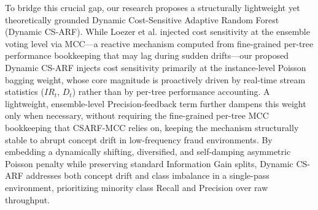 \documentclass[review,12pt]{elsarticle}
\begin{document}
To bridge this crucial gap, our research proposes a structurally lightweight yet theoretically grounded Dynamic Cost-Sensitive Adaptive Random Forest (Dynamic CS-ARF). While Loezer et al. injected cost sensitivity at the ensemble voting level via MCC---a reactive mechanism computed from fine-grained per-tree performance bookkeeping that may lag during sudden drifts---our proposed Dynamic CS-ARF injects cost sensitivity primarily at the instance-level Poisson bagging weight, whose core magnitude is proactively driven by real-time stream statistics ($IR_t$, $D_t$) rather than by per-tree performance accounting. A lightweight, ensemble-level Precision-feedback term further dampens this weight only when necessary, without requiring the fine-grained per-tree MCC bookkeeping that CSARF-MCC relies on, keeping the mechanism structurally stable to abrupt concept drift in low-frequency fraud environments. By embedding a dynamically shifting, diversified, and self-damping asymmetric Poisson penalty while preserving standard Information Gain splits, Dynamic CS-ARF addresses both concept drift and class imbalance in a single-pass environment, prioritizing minority class Recall and Precision over raw throughput.
\end{document}
